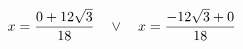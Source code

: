 \documentclass[preview]{standalone}
\begin{document}
\begin{align*}
\special{dvisvgm:raw <g id='unique000'>}x=\frac{0 + 12 \sqrt{3}}{18} \quad \lor \quad x=\frac{- 12 \sqrt{3} + 0}{18}\special{dvisvgm:raw </g>}
\end{align*}
\end{document}
